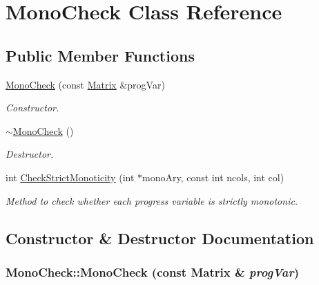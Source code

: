 \hypertarget{classMonoCheck}{
\section{MonoCheck Class Reference}
\label{d8/ddf/classMonoCheck}
}
\subsection*{Public Member Functions}
\begin{DoxyCompactItemize}
\item 
\hyperlink{classMonoCheck_a4cee9c89dd8a6c19cd01d597343c4d99}{MonoCheck} (const \hyperlink{classMatrix}{Matrix} \&progVar)
\begin{DoxyCompactList}\small\item\em Constructor. \item\end{DoxyCompactList}\item 
\hypertarget{classMonoCheck_a97dc563e5cad68eafabd498d66e86590}{
\hyperlink{classMonoCheck_a97dc563e5cad68eafabd498d66e86590}{$\sim$MonoCheck} ()}
\label{d8/ddf/classMonoCheck_a97dc563e5cad68eafabd498d66e86590}

\begin{DoxyCompactList}\small\item\em Destructor. \item\end{DoxyCompactList}\item 
int \hyperlink{classMonoCheck_af34f3d72ec2d1575526d42bfe4cdfe7a}{CheckStrictMonoticity} (int $\ast$monoAry, const int ncols, int col)
\begin{DoxyCompactList}\small\item\em Method to check whether each progress variable is strictly monotonic. \item\end{DoxyCompactList}\end{DoxyCompactItemize}


\subsection{Constructor \& Destructor Documentation}
\hypertarget{classMonoCheck_a4cee9c89dd8a6c19cd01d597343c4d99}{
\subsubsection[{MonoCheck}]{\setlength{\rightskip}{0pt plus 5cm}MonoCheck::MonoCheck (const {\bf Matrix} \& {\em progVar})}}
\label{d8/ddf/classMonoCheck_a4cee9c89dd8a6c19cd01d597343c4d99}


